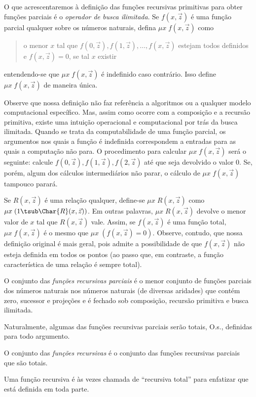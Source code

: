 \documentclass[../../../include/open-logic-section]{subfiles}
\begin{document}
O que acrescentaremos à definição das funções recursivas primitivas
para obter funções parciais é o \emph{operador de busca ilimitada}. Se
$f(x,\vec z)$ é uma função parcial qualquer sobre os números naturais,
defina $\mu x \; f(x,\vec z)$ como
\begin{quote}
  o menor $x$ tal que $f(0,\vec z), f(1,\vec z), \dots, f(x,\vec
  z)$ estejam todos definidos e $f(x,\vec z) = 0$, se tal $x$ existir
\end{quote}
entendendo-se que $\mu x \; f(x,\vec z)$ é indefinido caso contrário.
Isso define $\mu x \; f(x,\vec z)$ de maneira única.

\begin{explain}
Observe que nossa definição não faz referência a algoritmos ou a qualquer modelo computacional
específico. Mas, assim como ocorre com a composição e a recursão
primitiva, existe uma intuição operacional e computacional por trás da
busca ilimitada. Quando se trata da computabilidade de uma função
parcial, os argumentos nos quais a função é indefinida correspondem a
entradas para as quais a computação não para. O procedimento para
calcular $\mu x \; f(x,\vec z)$ será o seguinte: calcule
$f(0,\vec z), f(1,\vec z), f(2,\vec z)$ até que seja devolvido o valor
0. Se, porém, algum dos cálculos intermediários não parar, o cálculo de
$\mu x \; f(x,\vec z)$ tampouco parará.
\end{explain}

Se $R(x,\vec z)$ é uma relação qualquer, define-se
$\mu x \; R(x,\vec z)$ como $\mu x \; (1 \tsub \Char{R}(x,\vec z))$.
Em outras palavras, $\mu x \; R(x,\vec z)$ devolve o menor valor de $x$
tal que $R(x,\vec z)$ vale. Assim, se $f(x,\vec z)$ é uma função total,
$\mu x \; f(x,\vec z)$ é o mesmo que $\mu x \; (f(x,\vec z) = 0)$.
Observe, contudo, que nossa definição original é mais geral, pois
admite a possibilidade de que $f(x,\vec z)$ não esteja definida em
todos os pontos (ao passo que, em contraste, a função característica
de uma relação é sempre total).

\begin{defn}
O conjunto das \emph{funções recursivas parciais} é o menor conjunto
de funções parciais dos números naturais nos números naturais (de
diversas aridades) que contém zero, sucessor e projeções e é fechado sob
composição, recursão primitiva e busca ilimitada.
\end{defn}

Naturalmente, algumas das funções recursivas parciais serão totais,
O.s.\@, definidas para todo argumento.

\begin{defn}
O conjunto das \emph{funções recursivas} é
o conjunto das funções recursivas parciais que são totais.
\end{defn}

Uma função recursiva é às vezes chamada de ``recursiva total'' para
enfatizar que está definida em toda parte.
\end{document}
